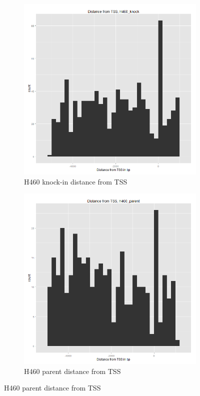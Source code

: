 \documentclass[11pt]{article}
\begin{document}
\begin{figure}[H]
\centering
\begin{subfigure}{.4\textwidth}
  \includegraphics[scale=0.3]{distribution_knocking.png}
  \caption{H460 knock-in distance from TSS}
  \label{fig:sub1}
\end{subfigure}
\quad
\begin{subfigure}{.4\textwidth}
  \includegraphics[scale=0.3]{distribution_parent.png}
  \caption{H460 parent distance from TSS}
  \label{fig:sub2}
\end{subfigure}

\label{fig:test}
\end{figure}
\end{document}
